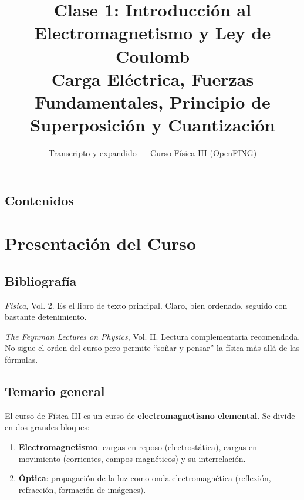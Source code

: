 \documentclass[12pt,a4paper]{article}
\title{\vspace{-1.5cm}\textbf{Clase 1: Introducción al Electromagnetismo y Ley de Coulomb}\\
\large{Carga Eléctrica, Fuerzas Fundamentales, Principio de Superposición y Cuantización}}
\author{Transcripto y expandido --- Curso Física III (OpenFING)}
\date{}
\begin{document}
\maketitle
\vspace{-0.5cm}

\subsection*{Contenidos}
\tableofcontents
\vspace{0.5cm}

\section{Presentación del Curso}

\subsection{Bibliografía}

\begin{refbox}
\begin{description}[nosep]
  \item [\textbf{Resnick \& Halliday}] \textit{Física}, Vol. 2. Es el libro de texto principal. Claro, bien ordenado, seguido con bastante detenimiento.
  \item [\textbf{Feynman, R.}] \textit{The Feynman Lectures on Physics}, Vol. II. Lectura complementaria recomendada. No sigue el orden del curso pero permite ``soñar y pensar'' la física más allá de las fórmulas.
\end{description}
\end{refbox}

\subsection{Temario general}

El curso de Física III es un curso de \textbf{electromagnetismo elemental}. Se divide en dos grandes bloques:

\begin{enumerate}[nosep]
  \item \textbf{Electromagnetismo}: cargas en reposo (electrostática), cargas en movimiento (corrientes, campos magnéticos) y su interrelación.
  \item \textbf{Óptica}: propagación de la luz como onda electromagnética (reflexión, refracción, formación de imágenes).
\end{enumerate}
\end{document}
